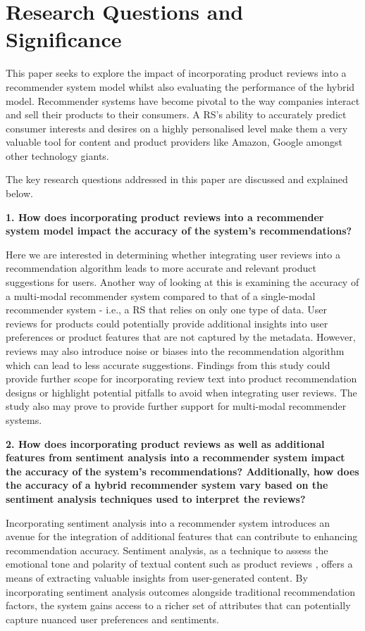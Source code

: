 
\section{Research Questions and Significance}
\label{chp1-sec3}

This paper seeks to explore the impact of incorporating product reviews into a recommender system model whilst also evaluating the performance of the hybrid model. Recommender systems have become pivotal to the way companies interact and sell their products to their consumers. A RS’s ability to accurately predict consumer interests and desires on a highly personalised level make them a very valuable tool for content and product providers  like Amazon, Google amongst other technology giants. 

The key research questions addressed in this paper are discussed and explained below. 

\textbf{1. How does incorporating product reviews into a recommender system model impact the accuracy of the system's recommendations?}

Here we are interested in determining whether integrating user reviews into a recommendation algorithm leads to more accurate and relevant product suggestions for users. Another way of looking at this is examining the accuracy of a multi-modal recommender system compared to that of a single-modal recommender system - i.e., a RS that relies on only one type of data. User reviews for products could potentially provide additional insights into user preferences or product features that are not captured by the metadata. However, reviews may also introduce noise or biases into the recommendation algorithm which can lead to less accurate suggestions. Findings from this study could provide further scope for incorporating review text into product recommendation designs or highlight potential pitfalls to avoid when integrating user reviews. The study also may prove to provide further support for multi-modal recommender systems. 

\textbf{2. How does incorporating product reviews as well as additional features from sentiment analysis into a recommender system impact the accuracy of the system's recommendations? Additionally, how does the accuracy of a hybrid recommender system vary based on the sentiment analysis techniques used to interpret the reviews?}

Incorporating sentiment analysis into a recommender system introduces an avenue for the integration of additional features that can contribute to enhancing recommendation accuracy. Sentiment analysis, as a technique to assess the emotional tone and polarity of textual content such as product reviews \citep{medhat2014sentiment}, offers a means of extracting valuable insights from user-generated content. By incorporating sentiment analysis outcomes alongside traditional recommendation factors, the system gains access to a richer set of attributes that can potentially capture nuanced user preferences and sentiments. 

